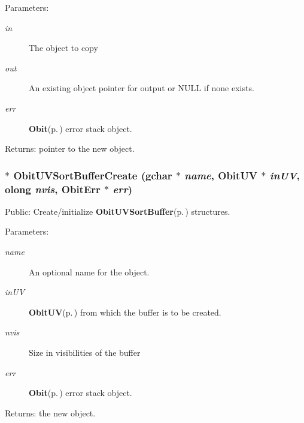 \begin{Desc}
\item[Parameters:]
\begin{description}
\item[{\em in}]The object to copy \item[{\em out}]An existing object pointer for output or NULL if none exists. \item[{\em err}]{\bf Obit}{\rm (p.\,\pageref{structObit})} error stack object. \end{description}
\end{Desc}
\begin{Desc}
\item[Returns:]pointer to the new object. \end{Desc}
\subsubsection{$\ast$ Obit\-UVSort\-Buffer\-Create (gchar $\ast$ {\em name}, {\bf Obit\-UV} $\ast$ {\em in\-UV}, {\bf olong} {\em nvis}, {\bf Obit\-Err} $\ast$ {\em err})}\label{ObitUVSortBuffer_8h_a9}


Public: Create/initialize {\bf Obit\-UVSort\-Buffer}{\rm (p.\,\pageref{structObitUVSortBuffer})} structures. 

\begin{Desc}
\item[Parameters:]
\begin{description}
\item[{\em name}]An optional name for the object. \item[{\em in\-UV}]{\bf Obit\-UV}{\rm (p.\,\pageref{structObitUV})} from which the buffer is to be created. \item[{\em nvis}]Size in visibilities of the buffer \item[{\em err}]{\bf Obit}{\rm (p.\,\pageref{structObit})} error stack object. \end{description}
\end{Desc}
\begin{Desc}
\item[Returns:]the new object. \end{Desc}
